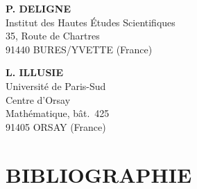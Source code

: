 \documentclass[12pt,a4paper]{article}
\theoremstyle{plain}
\theoremstyle{definition}
\theoremstyle{remark}
\begin{document}
\vspace{1cm}
\noindent
\begin{minipage}[t]{0.48\textwidth}
\textbf{P. DELIGNE}\\
Institut des Hautes Études Scientifiques\\
35, Route de Chartres\\
91440 BURES/YVETTE (France)
\end{minipage}
\hfill
\begin{minipage}[t]{0.48\textwidth}
\textbf{L. ILLUSIE}\\
Université de Paris-Sud\\
Centre d'Orsay\\
Mathématique, bât.~425\\
91405 ORSAY (France)
\end{minipage}

\vspace{1cm}
\section*{BIBLIOGRAPHIE}
\end{document}
